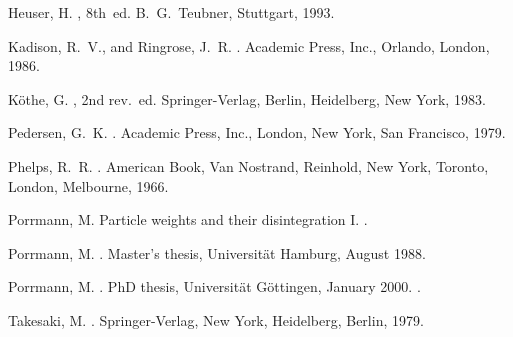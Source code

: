 \documentclass[a4paper,a4paper]{article}
\numberwithin{equation}{section}
\theoremstyle{definition}
\theoremstyle{plain}
\theoremstyle{remark}
\theoremstyle{assumption}
\begin{document}
\begin{thebibliography}{10}
{\sc Heuser, H.}
, 8th~ed.
\newblock B.~G.~Teubner, Stuttgart, 1993.

{\sc Kadison, R.~V., and Ringrose, J.~R.}
.
\newblock Academic Press, Inc., Orlando, London, 1986.

{\sc K\"othe, G.}
, 2nd rev.~ed.
\newblock Springer-Verlag, Berlin, Heidelberg, New York, 1983.

{\sc Pedersen, G.~K.}
.
\newblock Academic Press, Inc., London, New York, San Francisco, 1979.

{\sc Phelps, R.~R.}
.
\newblock American Book, Van Nostrand, Reinhold, New York, Toronto, London,
  Melbourne, 1966.

{\sc Porrmann, M.}
\newblock Particle weights and their disintegration {I}.
.

{\sc Porrmann, M.}
.
\newblock Master's thesis, Universit\"at Hamburg, August 1988.

{\sc Porrmann, M.}
.
\newblock PhD thesis, Universit\"at G\"ottingen, January 2000.
.

{\sc Takesaki, M.}
.
\newblock Springer-Verlag, New York, Heidelberg, Berlin, 1979.

\end{thebibliography}
\end{document}
